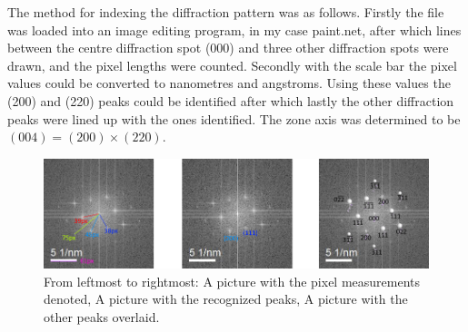 \documentclass[a4paper]{scrartcl}
\begin{document}
The method for indexing the diffraction pattern was as follows. Firstly the file was loaded into an image editing program, in my case paint.net, after which lines between the centre diffraction spot (000) and three other diffraction spots were drawn, and the pixel lengths were counted. Secondly with the scale bar the pixel values could be converted to nanometres and angstroms. Using these values the (200) and (220) peaks could be identified after which lastly the other diffraction peaks were lined up with the ones identified.
The zone axis was determined to be $(004) = (200) \times (220)$.
\newpage

\begin{figure}
  \centering
  \includegraphics[width=1\linewidth, keepaspectratio]{GaAs-EDP-index.png}
  \caption{From leftmost to rightmost: A picture with the pixel measurements denoted, A picture with the recognized peaks, A picture with the other peaks overlaid.}
\end{figure}
\end{document}
